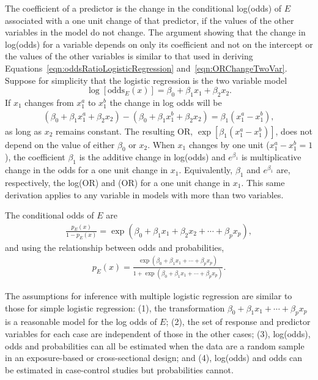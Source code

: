The coefficient of a predictor is the change in the conditional log(odds) of $E$ associated with a one unit change of that predictor, if the values of the other variables in the model do not change.  The argument showing that the change in log(odds) for a variable depends on only its coefficient and not on the intercept or the values of the other variables is similar to that used in deriving Equations~\ref{eqn:oddsRatioLogisticRegression} and~\ref{eqn:ORChangeTwoVar}.  Suppose for simplicity that the logistic regression is the two variable model\[
  \log\left[\text{odds}_E(x)\right] = \beta_0 + \beta_1 x_1 +
      \beta_2 x_2.
\]
If $x_1$ changes from $x_1^a$ to $x_1^b$ the change in log odds will be
\begin{align*}
  (\beta_0 + \beta_1 x_1^a + \beta_2 x_2) -  (\beta_0 + \beta_1 x_1^b + \beta_2 x_2)
    = \beta_1(x_1^a - x_1^b),
\end{align*}
as long as $x_2$ remains constant.  The resulting OR, $\exp[\beta_1(x_1^a - x_1^b)]$, does not depend on the value of either $\beta_0$ or $x_2$. When $x_1$ changes by one unit ($x_1^a - x_1^b = 1$), the coefficient $\beta_1$ is the additive change in log(odds) and $e^{\beta_1}$ is multiplicative change in the odds for a one unit change in $x_1$. Equivalently, $\beta_1$ and  $e^{\beta_1}$ are, respectively, the log(OR) and (OR) for a one unit change in $x_1$. This same derivation applies to any variable in models with more than two variables.

The conditional odds of $E$ are
\begin{align}
  \frac{p_E(x)}{1 - p_E(x)} = \exp(\beta_0 + \beta_1 x_1 +
  \beta_2 x_2 + \cdots + \beta_p x_p),
  \label{eqn:oddsMultipleLogistic}
\end{align}
and using the relationship between odds and probabilities,
\begin{align}
  p_E(x) = \frac{\exp(\beta_0 + \beta_1 x_1 + \cdots + \beta_p x_p)}
         {1 + \exp(\beta_0 + \beta_1 x_1 + \cdots + \beta_p x_p)}.
         \label{eqn:probabilityMultipleLogistic}
\end{align}

The assumptions for inference with multiple logistic regression are similar to those for simple logistic regression: (1), the transformation $\beta_0 + \beta_1 x_1 + \cdots + \beta_p x_p$ is a reasonable model for the log odds of $E$; (2), the set of response and predictor variables for each case are independent of those in the other cases; (3), log(odds), odds and probabilities can all be estimated when the data are a random sample in an exposure-based or cross-sectional design; and (4), log(odds) and odds can be estimated in case-control studies but probabilities cannot.

